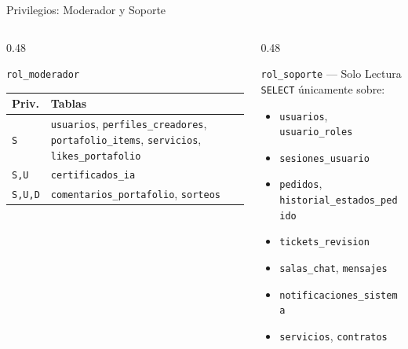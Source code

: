 \documentclass[aspectratio=169]{beamer}
\begin{document}
\begin{frame}{Privilegios: Moderador y Soporte}
    \begin{columns}[T]
        \begin{column}{0.48\textwidth}
            \begin{block}{\texttt{rol\_moderador}}
                \scriptsize
                \begin{tabular}{lp{3.5cm}}
                    \toprule
                    \textbf{Priv.} & \textbf{Tablas} \\
                    \midrule
                    \texttt{S} & \texttt{usuarios}, \texttt{perfiles\_creadores}, \texttt{portafolio\_items}, \texttt{servicios}, \texttt{likes\_portafolio} \\
                    \midrule
                    \texttt{S,U} & \texttt{certificados\_ia} \\
                    \midrule
                    \texttt{S,U,D} & \texttt{comentarios\_portafolio}, \texttt{sorteos} \\
                    \bottomrule
                \end{tabular}
            \end{block}
        \end{column}
        \begin{column}{0.48\textwidth}
            \begin{block}{\texttt{rol\_soporte} --- Solo Lectura}
                \scriptsize
                \texttt{SELECT} únicamente sobre:
                \begin{itemize}
                    \item \texttt{usuarios}, \texttt{usuario\_roles}
                    \item \texttt{sesiones\_usuario}
                    \item \texttt{pedidos}, \texttt{historial\_estados\_pedido}
                    \item \texttt{tickets\_revision}
                    \item \texttt{salas\_chat}, \texttt{mensajes}
                    \item \texttt{notificaciones\_sistema}
                    \item \texttt{servicios}, \texttt{contratos}
                \end{itemize}
            \end{block}
        \end{column}
    \end{columns}
\end{frame}
\end{document}
